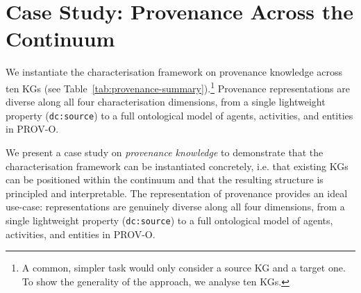 \documentclass[runningheads]{llncs}
\newenvironment{onlyextended}{\ignorespaces}{\ignorespacesafterend}
\newenvironment{onlyshort}{\ignorespaces}{\ignorespacesafterend}
\newcommand{\ppinfo}[1]{{ \normalfont\color{red}\small(#1 pp)}}
\renewcommand{\ppinfo}[1]{} %
\begin{document}
\section{Case Study: Provenance Across the Continuum\ppinfo{Starts at page 6, 0.5 the method + 0.5p each case study, 1.5}}\label{sec:provenance}\begin{onlyshort}\vspace{-0.2cm}\end{onlyshort}

\begin{onlyshort}
We instantiate the characterisation framework on provenance 
knowledge across ten KGs (see 
Table~\ref{tab:provenance-summary}).\footnote{A common, simpler task would only consider a source KG and a target one. To show the generality of the approach, we analyse ten KGs.}
Provenance representations are diverse along all four 
characterisation dimensions, from a single lightweight 
property (\texttt{dc:source}) to a full ontological model 
of agents, activities, and entities in PROV-O.
\end{onlyshort}

\begin{onlyextended}
We present a case study on 
\emph{provenance knowledge} to demonstrate that the 
characterisation framework can be instantiated concretely, i.e. 
that existing KGs can be positioned within the 
continuum and that the resulting structure is principled 
and interpretable. 
The representation of provenance provides an ideal use-case: 
representations are genuinely diverse along all four 
dimensions, from a single lightweight property 
(\texttt{dc:source}) to a full ontological model of 
agents, activities, and entities in PROV-O.
\end{onlyextended}
\end{document}
